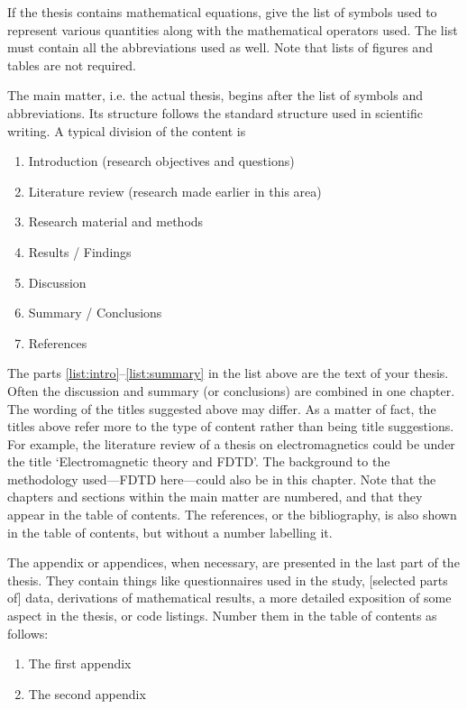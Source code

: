 \documentclass[english, 12pt, a4paper, elec, utf8, a-2b, online]{aaltothesis}
\begin{document}
If the thesis contains mathematical equations, give the list of symbols used to 
represent various quantities along with the mathematical operators used.
The list must contain all the abbreviations used as well. Note that lists of
figures and tables are not required.

The main matter, i.e. the actual thesis, begins after the list of symbols and 
abbreviations. Its structure follows the standard structure used in scientific 
writing. A typical division of the content is
\begin{enumerate}
	\item \label{list:intro} Introduction (research objectives and questions)
	\item Literature review (research made earlier in this area)
	\item Research material and methods
	\item Results / Findings
	\item Discussion
	\item \label{list:summary} Summary / Conclusions
	\item References
\end{enumerate}
The parts \ref{list:intro}--\ref{list:summary} in the list above are the text  
of your thesis. Often the discussion and summary (or conclusions) are combined 
in one chapter. The wording of the titles suggested above may differ. As a 
matter of fact, the titles above refer more to the type of content rather than 
being title suggestions. For example, the literature review of a thesis on 
electromagnetics could be under the title ‘Electromagnetic theory and FDTD’. 
The background to the methodology used---FDTD here---could also be in this 
chapter. Note that the chapters and sections within the main matter are 
numbered, and that they appear in the table of contents. The references, or the 
bibliography, is also shown in the table of contents, but without a number 
labelling it.

The appendix or appendices, when necessary, are presented in the last part of
the thesis. They contain things like questionnaires used in the study, 
[selected parts of] data, derivations of mathematical results, a more detailed 
exposition of some aspect in the thesis, or code listings. Number them in the 
table of contents as follows:
\begin{enumerate}
\renewcommand{\labelenumi}{\Alph{enumi}.}
	\item The first appendix
	\item The second appendix
\end{enumerate}
\end{document}
